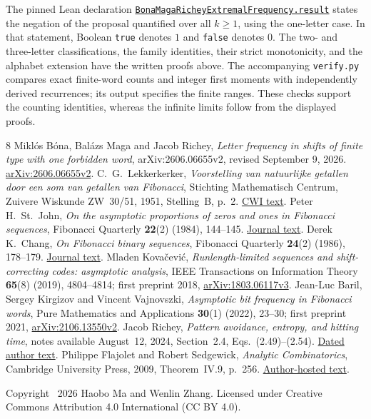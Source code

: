 \documentclass[11pt]{article}
\begin{document}
The pinned Lean declaration
\href{https://github.com/the-omega-institute/trureturing/blob/d4a6bd75fd78850fed8cf60aebb6ce7fceffa2e1/D5/S1/Words/Forbidden/BonaMagaRicheyExtremalFrequency.lean}
{\texttt{BonaMagaRicheyExtremalFrequency.result}}
states the negation of the proposal quantified over all $k\geq1$, using
the one-letter case. In that statement, Boolean \texttt{true} denotes $1$
and \texttt{false} denotes $0$. The two- and three-letter classifications,
the family identities, their strict monotonicity, and the alphabet extension
have the written proofs above.
The accompanying \texttt{verify.py} compares exact finite-word counts and
integer first moments with independently derived recurrences; its output
specifies the finite ranges. These checks support the counting identities,
whereas the infinite limits follow from the displayed proofs.

\begin{thebibliography}{8}
Mikl\'os B\'ona, Bal\'azs Maga and Jacob Richey,
\emph{Letter frequency in shifts of finite type with one forbidden word},
arXiv:2606.06655v2, revised September 9, 2026.
\href{https://arxiv.org/abs/2606.06655v2}{arXiv:2606.06655v2}.
C.~G.~Lekkerkerker,
\emph{Voorstelling van natuurlijke getallen door een som van getallen van Fibonacci},
Stichting Mathematisch Centrum, Zuivere Wiskunde ZW~30/51, 1951,
Stelling~B, p.~2.
\href{https://ir.cwi.nl/pub/6922}{CWI text}.
Peter H.~St.~John,
\emph{On the asymptotic proportions of zeros and ones in Fibonacci sequences},
Fibonacci Quarterly \textbf{22}(2) (1984), 144--145.
\href{https://www.fq.math.ca/Scanned/22-2/stjohn.pdf}{Journal text}.
Derek K.~Chang, \emph{On Fibonacci binary sequences},
Fibonacci Quarterly \textbf{24}(2) (1986), 178--179.
\href{https://www.fq.math.ca/Scanned/24-2/chang2.pdf}{Journal text}.
Mladen Kova\v{c}evi\'c,
\emph{Runlength-limited sequences and shift-correcting codes: asymptotic analysis},
IEEE Transactions on Information Theory \textbf{65}(8) (2019), 4804--4814;
first preprint 2018, \href{https://arxiv.org/abs/1803.06117v3}{arXiv:1803.06117v3}.
Jean-Luc Baril, Sergey Kirgizov and Vincent Vajnovszki,
\emph{Asymptotic bit frequency in Fibonacci words},
Pure Mathematics and Applications \textbf{30}(1) (2022), 23--30;
first preprint 2021, \href{https://arxiv.org/abs/2106.13550v2}{arXiv:2106.13550v2}.
Jacob Richey, \emph{Pattern avoidance, entropy, and hitting time},
notes available August~12, 2024, Section~2.4, Eqs.~(2.49)--(2.54).
\href{https://github.com/jfrichey/jfrichey.github.io/blob/846c835def30a51945bac23d8ed215b61056b87c/pagedocs/sft_patterns.pdf}{Dated author text}.
Philippe Flajolet and Robert Sedgewick,
\emph{Analytic Combinatorics}, Cambridge University Press, 2009,
Theorem~IV.9, p.~256.
\href{https://algo.inria.fr/flajolet/Publications/book.pdf}{Author-hosted text}.
\end{thebibliography}
\medskip\noindent\small
Copyright \textcopyright\ 2026 Haobo Ma and Wenlin Zhang.
Licensed under Creative Commons Attribution 4.0 International (CC BY 4.0).
\end{document}
